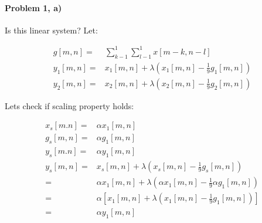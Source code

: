 \documentclass[11pt]{article}
\begin{document}
\MakeScribeTop


\paragraph{\noindent\textbf{\LARGE{Problem 1, a)}}}


\begin{flushleft}
Is this linear system? 
\newline
\newline
Let:
\end{flushleft}   
\begin{equation*}
\begin{split}
    g[m,n]      = & \sum_{k-1}^1 \sum_{l-1}^1 x[m-k, n-l] \\
    y_1[m,n]    = & x_1[m, n] + \lambda (x_1[m,n] - \frac{1}{9}g_1[m,n]) \\
    y_2[m,n]    = & x_2[m, n] + \lambda (x_2[m,n] - \frac{1}{9}g_2[m,n])
\end{split}
\end{equation*}
    


\begin{flushleft}
Lets check if scaling property holds:
\end{flushleft}   
\begin{equation*}
\begin{split}
    x_s[m.n]    =& \alpha x_1[m,n] \\
    g_s[m,n]    =& \alpha g_1[m,n] \\
    y_s[m.n]    =& \alpha y_1[m,n] \\
    y_s[m,n]    =& x_s[m, n] + \lambda (x_s[m,n] - \frac{1}{9}g_s[m,n]) \\
                =& \alpha x_1[m,n] + \lambda (\alpha x_1[m,n] - \frac{1}{9}\alpha g_1[m,n]) \\
                =& \alpha [x_1[m, n] + \lambda (x_1[m,n] - \frac{1}{9}g_1[m,n])] \\
                =& \alpha y_1[m,n]
\end{split}
\end{equation*}
\end{document}
